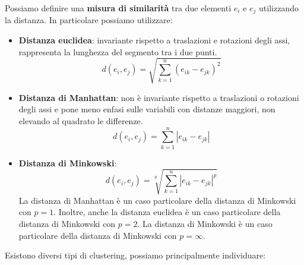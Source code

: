 \begin{definizione}
    Possiamo definire una \textbf{misura di similarità} tra due elementi $e_i$ e
    $e_j$ utilizzando la distanza. In particolare possiamo utilizzare:
    \begin{itemize}
        \item \textbf{Distanza euclidea}: invariante rispetto a traslazioni e
              rotazioni degli assi, rappresenta la lunghezza del segmento tra i
              due punti.
              \begin{equation}
                  d(e_i, e_j) = \sqrt{\sum_{k=1}^n (e_{ik} - e_{jk})^2}
              \end{equation}
        \item \textbf{Distanza di Manhattan}: non è invariante rispetto a
              traslazioni o rotazioni degli assi e pone meno enfasi sulle
              variabili con distanze maggiori, non elevando al quadrato le
              differenze.
              \begin{equation}
                  d(e_i, e_j) = \sum_{k=1}^n |e_{ik} - e_{jk}|
              \end{equation}
        \item \textbf{Distanza di Minkowski}:
              \begin{equation}
                  d(e_i, e_j) = \sqrt[p]{\sum_{k=1}^n |e_{ik} - e_{jk}|^p}
              \end{equation}
              La distanza di Manhattan è un caso particolare della distanza di
              Minkowski con $p = 1$. Inoltre, anche la distanza euclidea è un
              caso particolare della distanza di Minkowski con $p = 2$. La
              distanza di Minkowski è un caso particolare della distanza di
              Minkowski con $p = \infty$.
    \end{itemize}
\end{definizione}
Esistono diversi tipi di clustering, possiamo principalmente individuare:
